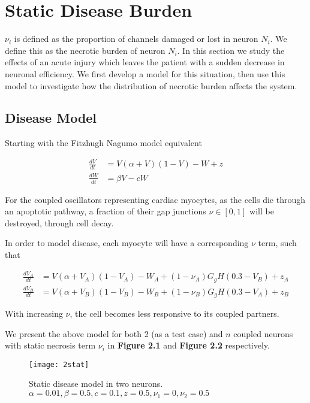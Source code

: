 \documentclass[11pt]{report}
\begin{document}
\section{Static Disease Burden} %
\label{sub:static_disease_burden}

$\nu_i$ is defined as the proportion of channels damaged or lost in neuron $N_i$. We define this as the necrotic burden of neuron $N_i$. In this section we study the effects of an acute injury which leaves the patient with a sudden decrease in neuronal efficiency. We first develop a model for this situation, then use this model to investigate how the distribution of necrotic burden affects the system.

\subsection{Disease Model} %
\label{sub:disease_model}



Starting with the Fitzhugh Nagumo model equivalent

$$ \begin{aligned} \frac{dV}{dt} &= V(\alpha +V)(1-V) -W +z\\ \frac{dW}{dt} &= \beta V - cW \end{aligned} $$

For the coupled oscillators representing cardiac myocytes, as the cells die through an apoptotic pathway, a fraction of their gap junctions $\nu \in [0,1]$ will be destroyed, through cell decay.

In order to model disease, each myocyte will have a corresponding $\nu$ term, such that

$$ \begin{aligned} \frac{dV_A}{dt} &= V(\alpha +V_A)(1-V_A) -W_A + (1-\nu_A) G_g H(0.3 - V_B) + z_A\\ \frac{dV_B}{dt} &= V(\alpha +V_B)(1-V_B) -W_B + (1-\nu_B) G_g H(0.3 - V_A) +z_B \end{aligned} $$


With increasing $\nu$, the cell becomes less responsive to its coupled partners.

We present the above model for both 2 (as a test case) and $n$ coupled neurons with static necrosis term $\nu_i$ in \textbf{Figure 2.1} and \textbf{Figure 2.2} respectively.

\begin{figure}[!ht]
  \caption{Static disease model in two neurons. $\alpha = 0.01, \beta = 0.5,c = 0.1,z = 0.5, \nu_1 = 0, \nu_2 = 0.5$ }
  \centering
    \texttt{[image: 2stat]}
\end{figure}
\end{document}

